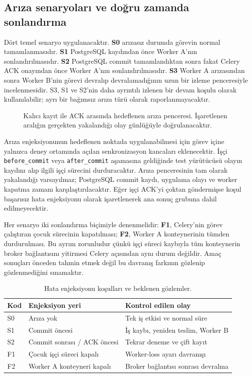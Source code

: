 \documentclass[conference,a4paper]{IEEEtran}
\newcommand{\code}[1]{\texttt{#1}}
\begin{document}
\subsection{Arıza senaryoları ve doğru zamanda sonlandırma}
Dört temel senaryo uygulanacaktır. \textbf{S0} arızasız durumda görevin normal tamamlanmasıdır. \textbf{S1} PostgreSQL kaydından önce Worker A'nın sonlandırılmasıdır. \textbf{S2} PostgreSQL commit tamamlandıktan sonra fakat Celery ACK onayından önce Worker A'nın sonlandırılmasıdır. \textbf{S3} Worker A arızasından sonra Worker B'nin görevi devralıp devralamadığının uzun bir izleme penceresiyle incelenmesidir. S3, S1 ve S2'nin daha ayrıntılı izlenen bir devam koşulu olarak kullanılabilir; ayrı bir bağımsız arıza türü olarak raporlanmayacaktır.

\begin{figure}[t]
\centering
\resizebox{\columnwidth}{!}{}
\caption{Kalıcı kayıt ile ACK arasında hedeflenen arıza penceresi. İşaretlenen aralığın gerçekten yakalandığı olay günlüğüyle doğrulanacaktır.}
\label{fig:timeline}
\end{figure}

Arıza enjeksiyonunun hedeflenen noktada uygulanabilmesi için görev içine yalnızca deney ortamında açılan senkronizasyon kancaları eklenecektir. İşçi \code{before\_commit} veya \code{after\_commit} aşamasına geldiğinde test yürütücüsü olayın kaydını alıp ilgili işçi sürecini durduracaktır. Arıza penceresinin tam olarak yakalandığı varsayılmaz; PostgreSQL commit kaydı, uygulama olayı ve worker kapatma zamanı karşılaştırılacaktır. Eğer işçi ACK'yi çoktan göndermişse koşul başarısız hata enjeksiyonu olarak işaretlenerek ana sonuç grubuna dahil edilmeyecektir.

Her senaryo iki sonlandırma biçimiyle denenmelidir: \textbf{F1}, Celery'nin görev çalıştıran çocuk sürecinin kapatılması; \textbf{F2}, Worker A konteynerinin tümden durdurulması. Bu ayrım zorunludur çünkü işçi süreci kaybıyla tüm konteynerin broker bağlantısını yitirmesi Celery açısından aynı durum değildir. Amaç sonuçları önceden tahmin etmek değil bu davranış farkının gözlenip gözlenmediğini sınamaktır.

\begin{table}[t]
\caption{Hata enjeksiyonu koşulları ve beklenen gözlemler.}
\centering\footnotesize
\begin{tabularx}{\columnwidth}{@{}p{8mm}p{31mm}X@{}}
\toprule
Kod & Enjeksiyon yeri & Kontrol edilen olay\\
\midrule
S0 & Arıza yok & Tek iş etkisi ve normal süre\\
S1 & Commit öncesi & İş kaybı, yeniden teslim, Worker B\\
S2 & Commit sonrası / ACK öncesi & Tekrar deneme ve çift kayıt\\
F1 & Çocuk işçi süreci kapalı & Worker-loss ayarı davranışı\\
F2 & Worker A konteyneri kapalı & Broker bağlantısı sonrası devralma\\
\bottomrule
\end{tabularx}
\label{tab:faults}
\end{table}
\end{document}
